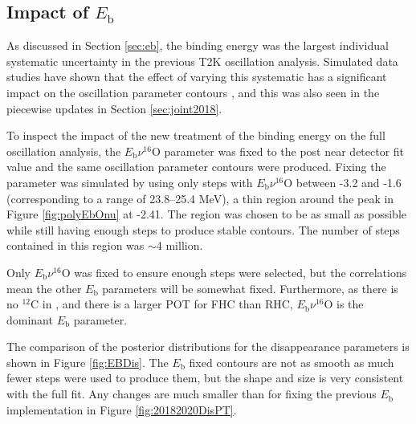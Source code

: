 \subsection{Impact of $E_{\mathrm{b}}$}\label{sec:jointeb}

As discussed in Section \ref{sec:eb}, the binding energy was the largest individual systematic uncertainty in the previous T2K oscillation analysis. Simulated data studies have shown that the effect of varying this systematic has a significant impact on the oscillation parameter contours \cite{tn331}, and this was also seen in the piecewise updates in Section \ref{sec:joint2018}.

To inspect the impact of the new treatment of the binding energy on the full oscillation analysis, the $E_{\mathrm{b}} \nu ^{16}$O parameter was fixed to the post near detector fit value and the same oscillation parameter contours were produced. Fixing the parameter was simulated by using only steps with $E_{\mathrm{b}} \nu ^{16}$O between -3.2 and -1.6 (corresponding to a range of 23.8--25.4 MeV), a thin region around the peak in Figure \ref{fig:polyEbOnu} at -2.41. The region was chosen to be as small as possible while still having enough steps to produce stable contours. The number of steps contained in this region was $\sim$4 million.

Only $E_{\mathrm{b}} \nu ^{16}$O was fixed to ensure enough steps were selected, but the correlations mean the other $E_{\mathrm{b}}$ parameters will be somewhat fixed. Furthermore, as there is no $^{12}$C in \SK, and there is a larger POT for FHC than RHC, $E_{\mathrm{b}} \nu ^{16}$O is the dominant $E_{\mathrm{b}}$ parameter.

The comparison of the posterior distributions for the disappearance parameters is shown in Figure \ref{fig:EBDis}. The $E_{\mathrm{b}}$ fixed contours are not as smooth as much fewer steps were used to produce them, but the shape and size is very consistent with the full fit. Any changes are much smaller than for fixing the previous $E_{\mathrm{b}}$ implementation in Figure \ref{fig:20182020DisPT}.

